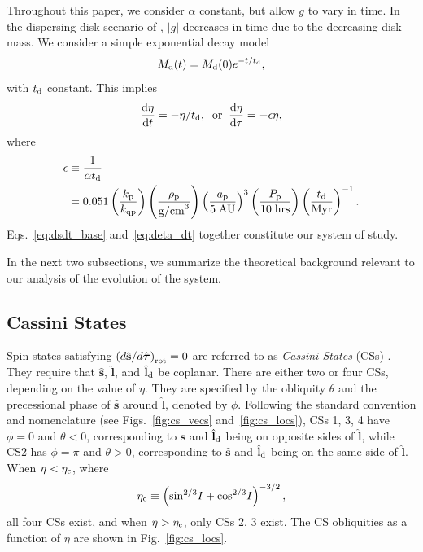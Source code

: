\documentclass[
        fleqn,
        usenatbib,
    ]{mnras}
\newcommand*{\rd}[2]{\frac{\mathrm{d}#1}{\mathrm{d}#2}}
\newcommand*{\abs}[1]{\left|#1\right|}
\newcommand*{\bm}[1]{\boldsymbol{\mathbf{#1}}}
\newcommand*{\uv}[1]{\hat{\bm{#1}}}
\newcommand*{\p}[1]{\left(#1\right)}
\begin{document}
Throughout this paper, we consider $\alpha$ constant, but allow $g$ to vary in
time. In the dispersing disk scenario of \citet{millholland_disk}, $\abs{g}$
decreases in time due to the decreasing disk mass. We consider a simple
exponential decay model
\begin{equation}
    M_{\rm d}(t) = M_{\rm d}(0)e^{-t/t_{\rm d}},\label{eq:dmd_dt}
\end{equation}
with $t_{\rm d}$ constant. This implies
\begin{equation}
    \rd{\eta}{t} = -\eta /t_{\rm d},\;\; \mathrm{or}\;\;
    \rd{\eta}{\tau} = -\epsilon \eta\label{eq:deta_dt},
\end{equation}
where
\begin{align}
    \epsilon \equiv{}& \frac{1}{\alpha t_{\rm d}}\nonumber\\
    ={}& 0.051 \p{\frac{k_{\rm p}}{k_{\rm qp}}}
        \p{\frac{\rho_{\rm p}}{\mathrm{g/cm}^3}}
        \p{\frac{a_{\rm p}}{5\;\mathrm{AU}}}^3
        \p{\frac{P_{\rm p}}{10\;\mathrm{hrs}}}
        \p{\frac{t_{\rm d}}{\mathrm{Myr}}}^{-1}.\label{eq:eps_def}
\end{align}
Eqs.~\eqref{eq:dsdt_base} and~\eqref{eq:deta_dt} together constitute our system
of study.

In the next two subsections, we summarize the theoretical background relevant to
our analysis of the evolution of the system.

\subsection{Cassini States}\label{ss:cs}

Spin states satisfying $\p{d\uv{s}/d\uv{\tau}}_{\rm rot} = 0$ are referred to as
\emph{Cassini States} (CSs) \citep{colombo1966,peale1969}. They require that
$\uv{s}$, $\uv{l}$, and $\uv{l}_{\rm d}$ be coplanar. There are either two or
four CSs, depending on the value of $\eta$. They are specified by the obliquity
$\theta$ and the precessional phase of $\uv{s}$ around $\uv{l}$, denoted by
$\phi$. Following the standard convention and nomenclature (see
Figs.~\ref{fig:cs_vecs} and~\ref{fig:cs_locs}), CSs 1, 3, 4 have $\phi = 0$ and
$\theta < 0$, corresponding to $\uv{s}$ and $\uv{l}_{\rm d}$ being on opposite
sides of $\uv{l}$, while CS2 has $\phi = \pi$ and $\theta > 0$, corresponding to
$\uv{s}$ and $\uv{l}_{\rm d}$ being on the same side of $\uv{l}$. When $\eta <
\eta_{\rm
c}$, where
\begin{equation}
    \eta_{\rm c} \equiv \p{\sin^{2/3}\!I + \cos^{2/3}\!I}^{-3/2},\label{eq:etac}
\end{equation}
all four CSs exist, and when $\eta > \eta_{\rm c}$, only CSs 2, 3 exist. The CS
obliquities as a function of $\eta$ are shown in Fig.~\ref{fig:cs_locs}.
\end{document}
